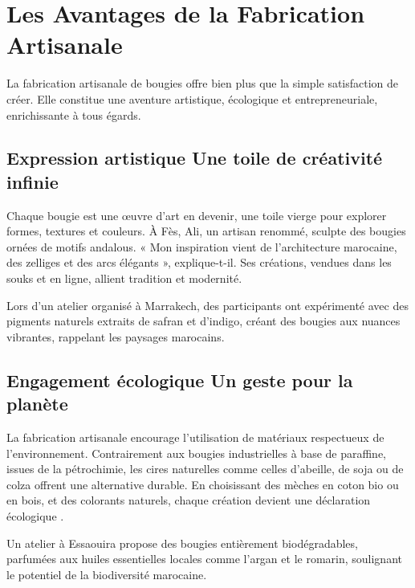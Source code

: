 \documentclass[11pt,fleqn,onecolumn,oneside]{book}
\begin{document}
\section{Les Avantages de la Fabrication Artisanale}

\begin{definition}
La fabrication artisanale de bougies offre bien plus que la simple satisfaction de créer. Elle constitue une aventure artistique, écologique et entrepreneuriale, enrichissante à tous égards.
\end{definition}

\subsection*{Expression artistique Une toile de créativité infinie}

Chaque bougie est une œuvre d'art en devenir, une toile vierge pour explorer formes, textures et couleurs. À Fès, Ali, un artisan renommé, sculpte des bougies ornées de motifs andalous. « Mon inspiration vient de l’architecture marocaine, des zelliges et des arcs élégants », explique-t-il. Ses créations, vendues dans les souks et en ligne, allient tradition et modernité.

\begin{example}
Lors d'un atelier organisé à Marrakech, des participants ont expérimenté avec des pigments naturels extraits de safran et d'indigo, créant des bougies aux nuances vibrantes, rappelant les paysages marocains.
\end{example}

\subsection*{Engagement écologique Un geste pour la planète}

La fabrication artisanale encourage l’utilisation de matériaux respectueux de l’environnement. Contrairement aux bougies industrielles à base de paraffine, issues de la pétrochimie, les cires naturelles comme celles d’abeille, de soja ou de colza offrent une alternative durable. En choisissant des mèches en coton bio ou en bois, et des colorants naturels, chaque création devient une déclaration écologique \cite{ecoFriendlyCandles}.

\begin{corollary}
Un atelier à Essaouira propose des bougies entièrement biodégradables, parfumées aux huiles essentielles locales comme l’argan et le romarin, soulignant le potentiel de la biodiversité marocaine.
\end{corollary}
\end{document}
